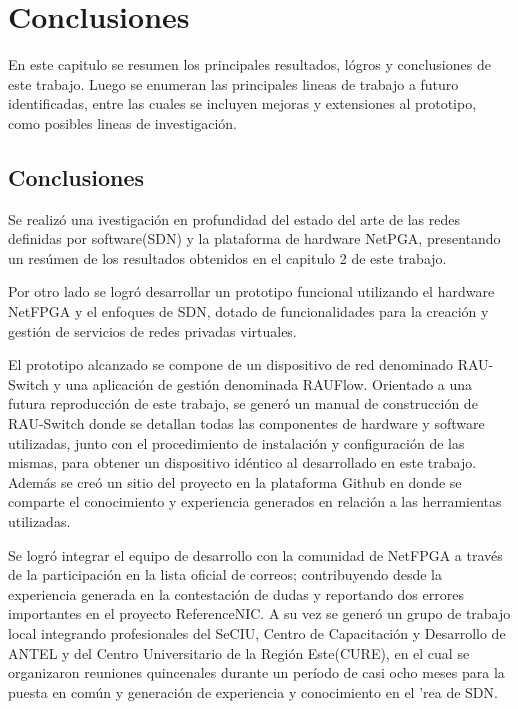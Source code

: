 \chapter{Conclusiones}

\ifpdf
    \graphicspath{{Chapter8/Figs/Raster/}{Chapter8/Figs/PDF/}{Chapter8/Figs/}}
\else
    \graphicspath{{Chapter8/Figs/Vector/}{Chapter8/Figs/}}
\fi

En este capitulo se resumen los principales resultados, l\'ogros y conclusiones de este trabajo. Luego se enumeran las principales lineas de trabajo a futuro identificadas, entre las cuales se incluyen mejoras y extensiones al prototipo, como posibles lineas de investigaci\'on.

\section{Conclusiones}
Se realiz\'o una ivestigaci\'on en profundidad del estado del arte de las redes definidas por software(SDN) y la plataforma de hardware NetPGA, presentando un res\'umen de los resultados obtenidos en el capitulo 2 de este trabajo.

Por otro lado se logr\'o desarrollar un prototipo funcional utilizando el hardware NetFPGA y el enfoques de SDN, dotado de funcionalidades para la creaci\'on y gesti\'on de servicios de redes privadas virtuales. 

El prototipo alcanzado se compone de un dispositivo de red denominado RAU-Switch y una aplicaci\'on de gesti\'on denominada RAUFlow. Orientado a una futura reproducci\'on de este trabajo, se gener\'o un manual de construcci\'on de RAU-Switch donde se detallan todas las componentes de hardware y software utilizadas, junto con el procedimiento de instalaci\'on y configuraci\'on de las mismas, para obtener un dispositivo id\'entico al desarrollado en este trabajo. Adem\'as se cre\'o un sitio del proyecto en la plataforma Github en donde se comparte el conocimiento y experiencia generados en relaci\'on a las herramientas utilizadas. 

Se logr\'o integrar el equipo de desarrollo con la comunidad de NetFPGA a trav\'es de la participaci\'on en la lista oficial de correos; contribuyendo desde la experiencia generada en la contestaci\'on de dudas y reportando dos errores importantes en el proyecto ReferenceNIC. A su vez se gener\'o un grupo de trabajo local integrando profesionales del SeCIU, Centro de Capacitaci\'on y Desarrollo de ANTEL y del Centro Universitario de la Regi\'on Este(CURE), en el cual se organizaron reuniones quincenales durante un per\'iodo de casi ocho meses para la puesta en com\'un y generaci\'on de experiencia y conocimiento en el \a'rea de SDN.

